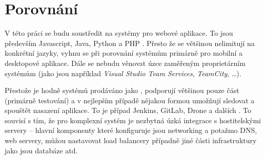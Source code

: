 \chapter{Porovnání}
    V této práci se budu soustředit na systémy pro webové aplikace. To jsou především Javascript, Java, Python a PHP \cite{github-octoverse-languages}. Přesto že se \CI většinou nelimitují na konkrétní jazyky, vyhnu se při porovnání systémům primárně pro mobilní a desktopové aplikace. Dále se nebudu věnovat úzce zaměřeným proprietárním systémům (jako jsou například \textit{Visual Studio Team Services}, \textit{TeamCity}, \ldots).


    Přestože je hodně systémů prodáváno jako \CICD, podporují většinou pouze \CI část (primárně testování) a v nejlepším případě nějakou formou umožňují sledovat a spouštět nasazení aplikace. To je případ Jenkins, GitLab, Drone a dalších \cite{ellingwood-cicd-list}. To souvisí s tím, že pro komplexní \CD systém je nezbytná úzká integrace s hostitelskými servery -- hlavní komponenty které \CD konfiguruje jsou networking a potažmo DNS, \HTTP web servery, můžou nastavovat load balancery případně jiné části infrastruktury jako jsou databáze atd.

    

    \newpage
    

    \newpage
    

    \newpage
    

    \newpage
    

    \newpage
    

    \newpage
    

    \newpage
    


    \newpage
    
